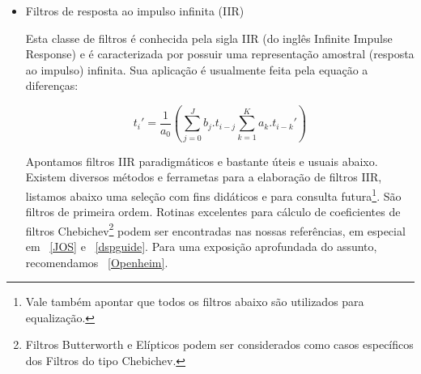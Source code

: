 \begin{itemize}
\item Filtros de resposta ao impulso infinita (IIR)

Esta classe de filtros é
conhecida pela sigla IIR (do inglês Infinite Impulse Response)
e é caracterizada por possuir uma representação amostral (resposta
ao impulso) infinita. Sua aplicação é usualmente feita pela equação
a diferenças:

\begin{equation}
t_i' = \frac{1}{a_0}\left ( \sum_{j=0}^Jb_j . t_{i-j} \sum_{k=1}^Ka_k . t_{i-k}' \right )
\end{equation}

Apontamos filtros IIR paradigmáticos e bastante úteis e usuais abaixo. Existem
diversos métodos e ferrametas para a elaboração de filtros IIR,
listamos abaixo uma seleção com fins didáticos e para consulta futura\footnote{Vale também
apontar que todos os filtros abaixo são utilizados para equalização.}.
São filtros de primeira ordem. Rotinas excelentes para cálculo de coeficientes
de filtros Chebichev\footnote{Filtros Butterworth e Elípticos podem
ser considerados como casos específicos dos Filtros do tipo Chebichev.} podem
ser encontradas nas nossas referências, em especial em ~\ref{JOS} e ~\ref{dspguide}.
Para uma exposição aprofundada do assunto, recomendamos ~\ref{Openheim}.

\end{itemize}


